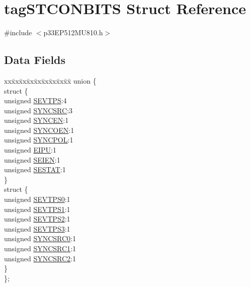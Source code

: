 \hypertarget{structtag_s_t_c_o_n_b_i_t_s}{}\section{tag\+S\+T\+C\+O\+N\+B\+I\+TS Struct Reference}
\label{structtag_s_t_c_o_n_b_i_t_s}


{\ttfamily \#include $<$p33\+E\+P512\+M\+U810.\+h$>$}

\subsection*{Data Fields}
\begin{DoxyCompactItemize}
\item 
\begin{tabbing}
xx\=xx\=xx\=xx\=xx\=xx\=xx\=xx\=xx\=\kill
union \{\\
\>struct \{\\
\>\>unsigned \hyperlink{structtag_s_t_c_o_n_b_i_t_s_ad265e80d2fbe67b2d2808ccbb6f2a567}{SEVTPS}:4\\
\>\>unsigned \hyperlink{structtag_s_t_c_o_n_b_i_t_s_a1bb9a287dbce989d2b9a9973e3b47f5b}{SYNCSRC}:3\\
\>\>unsigned \hyperlink{structtag_s_t_c_o_n_b_i_t_s_a6392f133d2270faa15aee1ce4471b7bd}{SYNCEN}:1\\
\>\>unsigned \hyperlink{structtag_s_t_c_o_n_b_i_t_s_aee433dab1c70b9e1281b911ab4cf4491}{SYNCOEN}:1\\
\>\>unsigned \hyperlink{structtag_s_t_c_o_n_b_i_t_s_ae93cf398c3356c587bda050c9c1d6553}{SYNCPOL}:1\\
\>\>unsigned \hyperlink{structtag_s_t_c_o_n_b_i_t_s_abbc746dab8c44ed4929f9cfd78dfb7fc}{EIPU}:1\\
\>\>unsigned \hyperlink{structtag_s_t_c_o_n_b_i_t_s_a6da1e1afed04bbca8b37c058fd690e64}{SEIEN}:1\\
\>\>unsigned \hyperlink{structtag_s_t_c_o_n_b_i_t_s_aec7c591bb5d18e2e8e29ec0f33d1f08a}{SESTAT}:1\\
\>\} \\
\>struct \{\\
\>\>unsigned \hyperlink{structtag_s_t_c_o_n_b_i_t_s_ae16b848b00591ac9565c3828075bb696}{SEVTPS0}:1\\
\>\>unsigned \hyperlink{structtag_s_t_c_o_n_b_i_t_s_a0cd678fed838bbf27fdb25b22cf2ce59}{SEVTPS1}:1\\
\>\>unsigned \hyperlink{structtag_s_t_c_o_n_b_i_t_s_af783ab1e2baf89973d617caf3e1f6997}{SEVTPS2}:1\\
\>\>unsigned \hyperlink{structtag_s_t_c_o_n_b_i_t_s_aeb947332f98d32331d09837c884fa9a1}{SEVTPS3}:1\\
\>\>unsigned \hyperlink{structtag_s_t_c_o_n_b_i_t_s_ac648079988b2735c2cc8f884b447150a}{SYNCSRC0}:1\\
\>\>unsigned \hyperlink{structtag_s_t_c_o_n_b_i_t_s_aeee1112578ba6bcc147b15471e22e0c4}{SYNCSRC1}:1\\
\>\>unsigned \hyperlink{structtag_s_t_c_o_n_b_i_t_s_a510f85838b8ccfa7589c313ef0ab07c2}{SYNCSRC2}:1\\
\>\} \\
\}; \\


\end{tabbing}
\end{DoxyCompactItemize}
